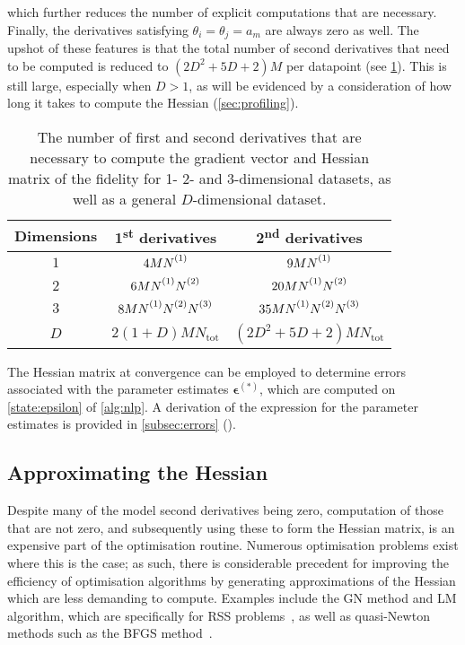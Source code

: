 which further reduces the number of explicit computations that are necessary.
Finally, the derivatives satisfying $\theta_i = \theta_j = a_m$ are always
zero as well. The upshot of these features is that the total number of second
derivatives that need to be computed is reduced to $(2D^2 + 5D + 2)M$ per
datapoint (see \cref{tab:number-of-derivatives}). This is still large,
especially when $D>1$, as will be evidenced by a consideration of how long it
takes to compute the Hessian (\cref{sec:profiling}).
\begin{table}
    \begin{center}
        \begin{tabular}{ c c c }
            \toprule
            Dimensions &
                \raisebox{\depth}{\#} 1\textsuperscript{st} derivatives &
                \raisebox{\depth}{\#} 2\textsuperscript{nd} derivatives\\
            \midrule
            $1$ & $4M\None$ & $9M\None$\\
            $2$ & $6M\None\Ntwo$ & $20M\None\Ntwo$\\
            $3$ & $8M\None\Ntwo\Nthree$ & $35M\None\Ntwo\Nthree$\\
            $D$ &  $2(1 + D)M N_{\text{tot}}$ &  $(2D^2 + 5D + 2) M N_{\text{tot}}$\\
            \bottomrule
        \end{tabular}
    \end{center}
    \caption[
        The number of first and second derivatives that are necessary to
        compute the gradient vector and Hessian matrix of the fidelity for
        \acs{FID} estimation.
    ]{
        The number of first and second derivatives that are necessary to
        compute the gradient vector and Hessian matrix of the fidelity for
        1- 2- and 3-dimensional datasets, as well as a general $D$-dimensional
        dataset.
    }
    \label{tab:number-of-derivatives}
\end{table}

The Hessian matrix at convergence can be employed to determine errors
associated with the parameter estimates $\symbf{\epsilon}^{(*)}$, which are
computed on \cref{state:epsilon} of \cref{alg:nlp}. A derivation of the
expression for the parameter estimates is provided in
\cref{subsec:errors} ().

\subsection{Approximating the Hessian}
\label{subsec:hess-approx}
Despite many of the model second derivatives being zero, computation of those
that are not zero, and subsequently using these to form the Hessian matrix,
is an expensive part of the optimisation routine.
Numerous optimisation problems exist where this is the case; as such,
there is considerable precedent for improving the efficiency of optimisation
algorithms by generating approximations of the Hessian which are less demanding
to compute.
Examples include the \ac{GN} method and \ac{LM} algorithm,
which are specifically for \ac{RSS} problems~\cite[Chapter
10]{Nocedal2006}, as well as quasi-Newton methods such as the \ac{BFGS}
method~\cite[Chapter 6]{Nocedal2006}.

